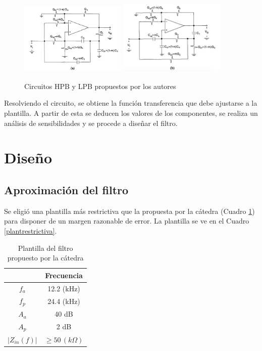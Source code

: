 \begin{figure}[H]
\begin{centering}
\includegraphics[width=0.45\textwidth]{../Ex3/Resources/sedracirc1.png}
\includegraphics[width=0.45\textwidth]{../Ex3/Resources/sedracirc2.png}
\par\end{centering}
\caption{Circuitos HPB y LPB propuestos por los autores}
\label{sedracircs}
\end{figure}

Resolviendo el circuito, se obtiene la función transferencia que debe ajustarse a la plantilla. A partir de esta se deducen los valores de los componentes, se realiza un análisis de sensibilidades y se procede a diseñar el filtro.




\section{Diseño}
\subsection{Aproximación del filtro}
Se eligió una plantilla más restrictiva que la propuesta por la cátedra (Cuadro \ref{3_c_1}) para disponer de un margen razonable de error. La plantilla se ve en el Cuadro \ref{plantrestrictiva}. 

\begin{table}[H]
\begin{centering}
\begin{tabular}{|c|c|}
\hline 
 & Frecuencia\tabularnewline
\hline 
\hline 
$f_{a}$ & 12.2 (kHz)\tabularnewline
\hline 
$f_{p}$ & 24.4 (kHz)\tabularnewline
\hline 
$A_{a}$ & 40 dB\tabularnewline
\hline 
$A_{p}$ & 2 dB\tabularnewline
\hline 
$\left|Z_{in}(f)\right|$ & $\geq50\,(k\Omega)$\tabularnewline
\hline 
\end{tabular}
\par\end{centering}
\caption{Plantilla del filtro propuesto por la cátedra}
\label{3_c_1}
\end{table}

